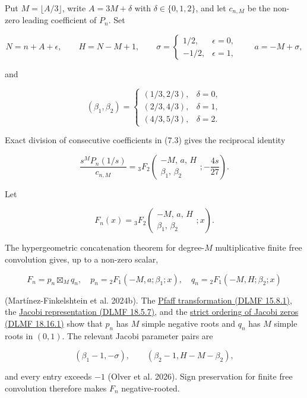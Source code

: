 \documentclass[
]{article}
\begin{document}
Put \(M=\lfloor A/3\rfloor\), write \(A=3M+\delta\) with
\(\delta\in\{0,1,2\}\), and let \(c_{n,M}\) be the non-zero leading
coefficient of \(P_n\). Set

\[
N=n+A+\epsilon,\qquad H=N-M+1,
\qquad
\sigma=\begin{cases}1/2,&\epsilon=0,\\-1/2,&\epsilon=1,\end{cases}
\qquad a=-M+\sigma,
\]

and

\[
(\beta_1,\beta_2)=
\begin{cases}
(1/3,2/3),&\delta=0,\\
(2/3,4/3),&\delta=1,\\
(4/3,5/3),&\delta=2.
\end{cases}
\]

Exact division of consecutive coefficients in (7.3) gives the reciprocal
identity

\[
\frac{s^MP_n(1/s)}{c_{n,M}}
={}_3F_2\!\left(
\begin{matrix}-M,\,a,\,H\\ \beta_1,\,\beta_2\end{matrix};
-\frac{4s}{27}\right).
\tag{7.6}
\]

Let

\[
F_n(x)={}_3F_2\!\left(
\begin{matrix}-M,\,a,\,H\\ \beta_1,\,\beta_2\end{matrix};x\right).
\]

The hypergeometric concatenation theorem for degree-\(M\) multiplicative
finite free convolution gives, up to a non-zero scalar,

\[
F_n=p_n\boxtimes_Mq_n,
\quad
p_n={}_2F_1(-M,a;\beta_1;x),
\quad
q_n={}_2F_1(-M,H;\beta_2;x)
\tag{7.7}
\]

(Martínez-Finkelshtein et al. 2024b). The
\href{https://dlmf.nist.gov/15.8.E1}{Pfaff transformation (DLMF
15.8.1)}, the \href{https://dlmf.nist.gov/18.5.E7}{Jacobi representation
(DLMF 18.5.7)}, and the \href{https://dlmf.nist.gov/18.16.E1}{strict
ordering of Jacobi zeros (DLMF 18.16.1)} show that \(p_n\) has \(M\)
simple negative roots and \(q_n\) has \(M\) simple roots in \((0,1)\).
The relevant Jacobi parameter pairs are

\[
(\beta_1-1,-\sigma),
\qquad
(\beta_2-1,H-M-\beta_2),
\]

and every entry exceeds \(-1\) (Olver et al. 2026). Sign preservation
for finite free convolution therefore makes \(F_n\) negative-rooted.
\end{document}
